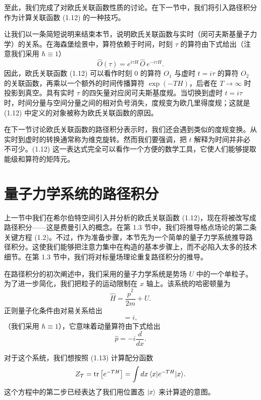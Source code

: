 至此，我们完成了对欧氏关联函数性质的讨论。在下一节中，我们将引入路径积分作为计算关联函数 (1.12) 的一种技巧。

让我们以一条简短说明来结束本节，说明欧氏关联函数与实时（闵可夫斯基量子力学）的关系。在海森堡绘景中，算符依赖于时间，时刻 $\tau$ 的算符由下式给出（注意我们采用 $\hbar \equiv 1$）
\begin{equation}
  \hat{O}(\tau) = e^{i\tau H}\,\hat{O}\,e^{-i\tau H}.
\end{equation}
因此，欧氏关联函数 (1.12) 可以看作时刻 0 的算符 $O_1$ 与虚时 $t = i\tau$ 的算符 $O_2$ 的关联函数，再乘以一个额外的时间传播算符 $\exp(-TH)$，后者在 $T \to \infty$ 时投影到真空。具有实时 $\tau$ 的四矢量对应闵可夫斯基度规。当切换到虚时 $t = i\tau$ 时，时间分量与空间分量之间的相对负号消失，度规变为欧几里得度规；这就是 (1.12) 中定义的对象被称为欧氏关联函数的原因。

在下一节讨论欧氏关联函数的路径积分表示时，我们还会遇到类似的度规变换。从实时到虚时的转换通常称为维克旋转。然而我们要强调，把 $t$ 解释为时间并非必不可少。(1.12) 这一表达式完全可以看作一个方便的数学工具，它使人们能够提取能级和算符的矩阵元。

\section{量子力学系统的路径积分}

上一节中我们在希尔伯特空间引入并分析的欧氏关联函数 (1.12)，现在将被改写成路径积分——这是费曼引入的概念。在第 1.3 节中，我们将推导格点场论的第二条关键方程 (1.2)。不过，作为准备步骤，本节先为一个简单的量子力学系统推导路径积分。这使我们能够把注意力集中在构造的基本步骤上，而不必陷入太多的技术细节。在第 1.3 节中，我们将对标量场理论重复路径积分的推导。

在路径积分的初次阐述中，我们采用的量子力学系统是势场 $U$ 中的一个单粒子。为了进一步简化，我们把粒子的运动限制在 $x$ 轴上。该系统的哈密顿量为
\begin{equation}
  \hat{H} = \frac{\hat{p}^2}{2m} + U.
\end{equation}
正则量子化条件由对易关系给出
\begin{equation}
  [\hat{x}, \hat{p}] = i,
\end{equation}
（我们采用 $\hbar \equiv 1$），它意味着动量算符由下式给出
\begin{equation}
  \hat{p} = -i\frac{d}{dx}.
\end{equation}

对于这个系统，我们想按照 (1.13) 计算配分函数
\begin{equation}
  Z_T = \operatorname{tr}\big[e^{-TH}\big] = \int dx\,\langle x|e^{-TH}|x\rangle.
\end{equation}
这个方程中的第二步已经表达了我们用位置态 $|x\rangle$ 来计算迹的意图。

